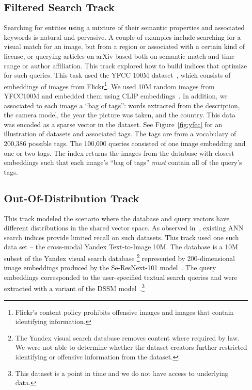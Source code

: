 \subsection{Filtered Search Track}
Searching for entities using a mixture of their semantic properties and associated keywords is natural and pervasive.
%
A couple of examples include searching for a visual match for an image, but from a region or associated with a certain kind of license,
or querying articles on arXiv based both on semantic match and time range or author affiliation.
%
This track explored how to build indices that optimize for such queries.
%
This task used the YFCC 100M dataset~\cite{thomee2016yfcc100m}, which consists of embeddings of images from Flickr\footnote{Flickr's content policy prohibits offensive images and images that contain identifying information.}. 
%
We used 10M random images from YFCC100M and embedded them using CLIP embeddings~\cite{radford2021learning}.
%
In addition, we associated to each image a ``bag of tags'': words extracted from the description, 
the camera model, the year the picture was taken, and the country.
%
This data was encoded as a sparse vector in the dataset.
%
See Figure~\ref{fig:yfcc} for an illustration of datasets and associated tags. 
%
The tags are from a vocabulary of 200,386 possible tags. 
%
The 100,000 queries consisted of one image embedding and one or two tags.
%
The index returns the images from the database with closest embeddings such that each 
image's ``bag of tags'' \emph{must}  contain all of the query's tags.

\subsection{Out-Of-Distribution Track}
This track modeled the scenario where the database and query vectors have different distributions in the shared vector space.
%
As observed in~\cite{jaiswal2022ooddiskann}, existing ANN search indices provide limited recall on such datasets.
%
This track used one such data set -- the cross-modal Yandex Text-to-Image 10M.
%
The database is a 10M subset of the Yandex visual search database
\footnote{The Yandex visual search database removes content where required by law. We were not able to determine whether the dataset creators further restricted identifying or offensive information from the dataset.}
represented by  200-dimensional image embeddings produced by the Se-ResNext-101 model~\cite{hu2018squeeze}.
%
The query embeddings corresponded to the user-specified textual search queries and were extracted with a variant of the DSSM model~\cite{huang2013learning}.\footnote{This dataset is a point in time and we do not have access to underlying data.}

